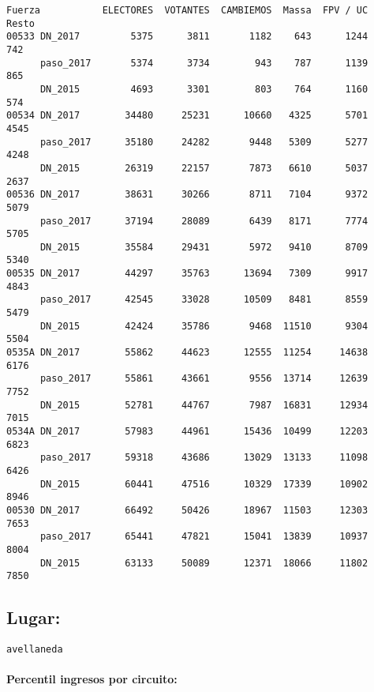 \documentclass[11pt]{article}
\begin{document}
    \begin{verbatim}
Fuerza           ELECTORES  VOTANTES  CAMBIEMOS  Massa  FPV / UC  Resto
00533 DN_2017         5375      3811       1182    643      1244    742
      paso_2017       5374      3734        943    787      1139    865
      DN_2015         4693      3301        803    764      1160    574
00534 DN_2017        34480     25231      10660   4325      5701   4545
      paso_2017      35180     24282       9448   5309      5277   4248
      DN_2015        26319     22157       7873   6610      5037   2637
00536 DN_2017        38631     30266       8711   7104      9372   5079
      paso_2017      37194     28089       6439   8171      7774   5705
      DN_2015        35584     29431       5972   9410      8709   5340
00535 DN_2017        44297     35763      13694   7309      9917   4843
      paso_2017      42545     33028      10509   8481      8559   5479
      DN_2015        42424     35786       9468  11510      9304   5504
0535A DN_2017        55862     44623      12555  11254     14638   6176
      paso_2017      55861     43661       9556  13714     12639   7752
      DN_2015        52781     44767       7987  16831     12934   7015
0534A DN_2017        57983     44961      15436  10499     12203   6823
      paso_2017      59318     43686      13029  13133     11098   6426
      DN_2015        60441     47516      10329  17339     10902   8946
00530 DN_2017        66492     50426      18967  11503     12303   7653
      paso_2017      65441     47821      15041  13839     10937   8004
      DN_2015        63133     50089      12371  18066     11802   7850
    \end{verbatim}

    
    \hypertarget{lugar}{%
\subsection{Lugar:}\label{lugar}}

    
    \begin{Verbatim}[commandchars=\\\{\}]
avellaneda

    \end{Verbatim}

    \hypertarget{percentil-ingresos-por-circuito}{%
\paragraph{Percentil ingresos por
circuito:}\label{percentil-ingresos-por-circuito}}
\end{document}
